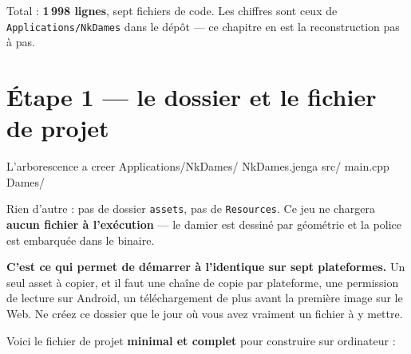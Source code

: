 \noindent Total : \textbf{1\,998 lignes}, sept fichiers de code. Les chiffres
sont ceux de \texttt{Applications/NkDames} dans le dépôt --- ce chapitre en est
la reconstruction pas à pas.

\section{Étape 1 --- le dossier et le fichier de projet}

\begin{nkcode}{L'arborescence a creer}
Applications/NkDames/
    NkDames.jenga
    src/
        main.cpp
        Dames/
\end{nkcode}

Rien d'autre : pas de dossier \texttt{assets}, pas de \texttt{Resources}. Ce jeu
ne chargera \textbf{aucun fichier à l'exécution} --- le damier est dessiné par
géométrie et la police est embarquée dans le binaire.

\begin{nkretenir}
\textbf{C'est ce qui permet de démarrer à l'identique sur sept plateformes.} Un
seul asset à copier, et il faut une chaîne de copie par plateforme, une
permission de lecture sur Android, un téléchargement de plus avant la première
image sur le Web. Ne créez ce dossier que le jour où vous avez vraiment un
fichier à y mettre.
\end{nkretenir}

Voici le fichier de projet \textbf{minimal et complet} pour construire sur
ordinateur :

